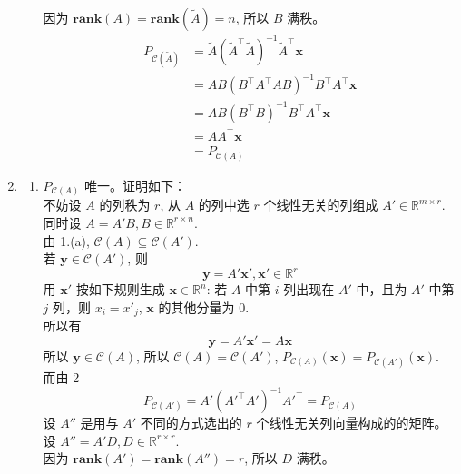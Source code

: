\documentclass[11pt,letter,notitlepage]{article}
\newcommand{\rank}[1]{ \textbf{rank}  (#1)  }
\begin{document}
\begin{solution}
\begin{enumerate}
\begin{enumerate}
                  因为 $\rank{A}=\rank{\widetilde{A}}=n$, 所以 $B$ 满秩。
                  $$\begin{aligned}
                      P_{\mathcal{C}(\widetilde{A})}
                      &= \widetilde{A} \left(\widetilde{A}^\top \widetilde{A}\right)^{-1} \widetilde{A}^\top \mathbf{x} \\
                      &=AB \left(B^\top A^\top AB\right)^{-1} B^\top A^\top \mathbf{x} \\
                        &=AB \left(B^\top B\right)^{-1} B^\top A^\top \mathbf{x} \\
                        & =AA^\top \mathbf{x} \\
                        &= P_{\mathcal{C}(A)}
                  \end{aligned}$$
              \end{enumerate}
        \item \begin{enumerate}
                  \item $P_{\mathcal{C}(A)}$ 唯一。证明如下：\\
                        不妨设 $A$ 的列秩为 $r$, 从 $A$ 的列中选 $r$ 个线性无关的列组成 $A'\in\mathbb{R}^{m\times r}$. \\
                        同时设 $A=A' B, B\in \mathbb{R}^{r\times n}$. \\
                        由 1.(a), $\mathcal{C}(A) \subseteq \mathcal{C}(A')$. \\
                        若 $\mathbf{y} \in \mathcal{C}(A')$, 则
                        $$\mathbf{y}=A' \mathbf{x}', \mathbf{x}'\in \mathbb{R}^{r}$$
                        用 $\mathbf{x}'$ 按如下规则生成 $\mathbf{x}\in\mathbb{R}^n$:
                        若 $A$ 中第 $i$ 列出现在 $A'$ 中，且为 $A'$ 中第 $j$ 列，则 $x_i=x'_j$, $\mathbf{x}$ 的其他分量为 $0$. \\
                        所以有 $$\mathbf{y}=A' \mathbf{x}'=A\mathbf{x}$$
                        所以 $\mathbf{y}\in\mathcal{C}(A)$, 所以 $\mathcal{C}(A)=\mathcal{C}(A')$, $P_{\mathcal{C}(A)}(\mathbf{x})=P_{\mathcal{C}(A')}(\mathbf{x})$. \\
                        而由 2 $$P_{\mathcal{C}(A')}=A' \left( A'^\top A' \right)^{-1}A'^\top=P_{\mathcal{C}(A)}$$
                        设 $A''$ 是用与 $A'$ 不同的方式选出的 $r$ 个线性无关列向量构成的的矩阵。\\
                        设 $A''=A'D, D\in\mathbb{R}^{r\times r}$. \\
                        因为 $\rank{A'}=\rank{A''}=r$, 所以 $D$ 满秩。\\

\end{enumerate}
\end{enumerate}
\end{solution}
\end{document}
